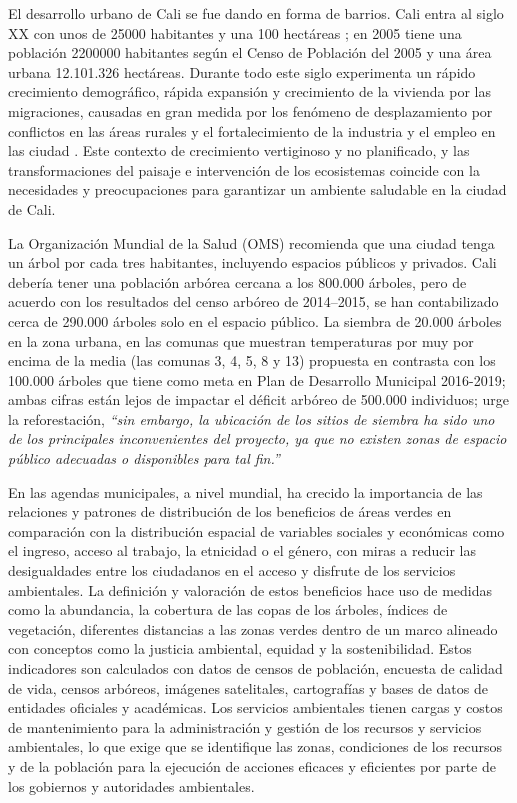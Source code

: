 \documentclass[12pt,]{book}
\begin{document}
El desarrollo urbano de Cali se fue dando en forma de barrios. Cali
entra al siglo XX con unos de 25000 habitantes y una 100 hectáreas
\citep{vasquez_historia_1990}; en 2005 tiene una población 2200000
habitantes según el Censo de Población del 2005 y una área urbana
12.101.326 hectáreas. Durante todo este siglo experimenta un rápido
crecimiento demográfico, rápida expansión y crecimiento de la vivienda
por las migraciones, causadas en gran medida por los fenómeno de
desplazamiento por conflictos en las áreas rurales y el fortalecimiento
de la industria y el empleo en las ciudad \citep{vasquez_historia_1990}.
Este contexto de crecimiento vertiginoso y no planificado, y las
transformaciones del paisaje e intervención de los ecosistemas coincide
con la necesidades y preocupaciones para garantizar un ambiente
saludable en la ciudad de Cali.

La Organización Mundial de la Salud (OMS) recomienda que una ciudad
tenga un árbol por cada tres habitantes, incluyendo espacios públicos y
privados. Cali debería tener una población arbórea cercana a los 800.000
árboles, pero de acuerdo con los resultados del censo arbóreo de
2014--2015, se han contabilizado cerca de 290.000 árboles solo en el
espacio público. La siembra de 20.000 árboles en la zona urbana, en las
comunas que muestran temperaturas por muy por encima de la media (las
comunas 3, 4, 5, 8 y 13) propuesta en \citep{ciat_identificacion_2015}
contrasta con los 100.000 árboles que tiene como meta en Plan de
Desarrollo Municipal 2016-2019; ambas cifras están lejos de impactar el
déficit arbóreo de 500.000 individuos; urge la reforestación,
\emph{``sin embargo, la ubicación de los sitios de siembra ha sido uno
de los principales inconvenientes del proyecto, ya que no existen zonas
de espacio público adecuadas o disponibles para tal fin.''}
\citep[p.~19]{ciat_identificacion_2015}

En las agendas municipales, a nivel mundial, ha crecido la importancia
de las relaciones y patrones de distribución de los beneficios de áreas
verdes en comparación con la distribución espacial de variables sociales
y económicas como el ingreso, acceso al trabajo, la etnicidad o el
género, con miras a reducir las desigualdades entre los ciudadanos en el
acceso y disfrute de los servicios ambientales. La definición y
valoración de estos beneficios hace uso de medidas como la abundancia,
la cobertura de las copas de los árboles, índices de vegetación,
diferentes distancias a las zonas verdes dentro de un marco alineado con
conceptos como la justicia ambiental, equidad y la sostenibilidad. Estos
indicadores son calculados con datos de censos de población, encuesta de
calidad de vida, censos arbóreos, imágenes satelitales, cartografías y
bases de datos de entidades oficiales y académicas. Los servicios
ambientales tienen cargas y costos de mantenimiento para la
administración y gestión de los recursos y servicios ambientales, lo que
exige que se identifique las zonas, condiciones de los recursos y de la
población para la ejecución de acciones eficaces y eficientes por parte
de los gobiernos y autoridades ambientales.
\end{document}
